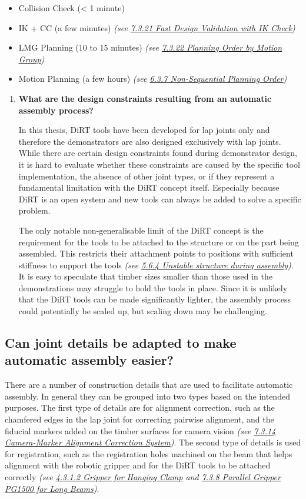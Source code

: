 \documentclass[11pt]{book}
\begin{document}
\begin{itemize}
	\item Collision Check (< 1 minute)

	\item IK + CC (a few minutes) \textit{(see \uline{7.3.21 Fast Design Validation with IK Check})}

	\item LMG Planning (10 to 15 minutes) \textit{(see \uline{7.3.22 Planning Order by Motion Group})}

	\item Motion Planning (a few hours) \textit{(see \uline{6.3.7 Non-Sequential Planning Order})}

\end{itemize}
\begin{enumerate}
	\item \textbf{What are the design constraints resulting from an automatic assembly process?}

In this thesis, DiRT tools have been developed for lap joints only and therefore the demonstrators are also designed exclusively with lap joints. While there are certain design constraints found during demonstrator design, it is hard to evaluate whether these constraints are caused by the specific tool implementation, the absence of other joint types, or if they represent a fundamental limitation with the DiRT concept itself. Especially because DiRT is an open system and new tools can always be added to solve a specific problem.

The only notable non-generalisable limit of the DiRT concept is the requirement for the tools to be attached to the structure or on the part being assembled. This restricts their attachment points to positions with sufficient stiffness to support the tools \textit{(see \uline{5.6.4 Unstable structure during assembly})}. It is easy to speculate that timber sizes smaller than those used in the demonstrations may struggle to hold the tools in place. Since it is unlikely that the DiRT tools can be made significantly lighter, the assembly process could potentially be scaled up, but scaling down may be challenging.

\end{enumerate}
\subsection{Can joint details be adapted to make automatic assembly easier?}

There are a number of construction details that are used to facilitate automatic assembly. In general they can be grouped into two types based on the intended purposes. The first type of details are for alignment correction, such as the chamfered edges in the lap joint for correcting pairwise alignment, and the fiducial markers added on the timber surfaces for camera vision \textit{(see \uline{7.3.14 Camera-Marker Alignment Correction System})}. The second type of details is used for registration, such as the registration holes machined on the beam that helps alignment with the robotic gripper and for the DiRT tools to be attached correctly \textit{(see \uline{4.3.1.2 Gripper for Hanging Clamp} and \uline{7.3.8 Parallel Gripper PG1500 for Long Beams})}.
\end{document}
